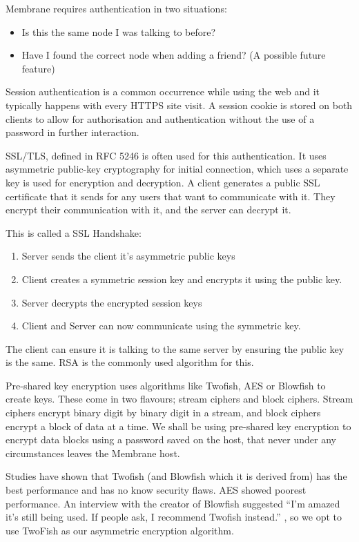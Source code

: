 \documentclass[11pt, a4paper, twocolumn, twoside]{report}
\begin{document}
Membrane requires authentication in two situations:
\begin{itemize}
 \item Is this the same node I was talking to before?
 \item Have I found the correct node when adding a friend? (A possible future feature)
\end{itemize}

Session authentication is a common occurrence while using the web and it typically happens with every HTTPS site visit. A session cookie is stored on both clients to allow for authorisation and authentication without the use of a password in further interaction. \citep{mayo2008security}

SSL/TLS, defined in RFC 5246 \citep{dierks2008transport} is often used for this authentication. It uses asymmetric public-key cryptography for initial connection, which uses a separate key is used for encryption and decryption. A client generates a public SSL certificate that it sends for any users that want to communicate with it. They encrypt their communication with it, and the server can decrypt it.

This is called a SSL Handshake:

\begin{enumerate}
 \item Server sends the client it's asymmetric public keys
 \item Client creates a symmetric session key and encrypts it using the public key.
 \item Server decrypts the encrypted session keys
 \item Client and Server can now communicate using the symmetric key.
\end{enumerate}

The client can ensure it is talking to the same server by ensuring the public key is the same. RSA is the commonly used algorithm for this.

Pre-shared key encryption uses algorithms like Twofish, AES or Blowfish to create keys. These come in two flavours; stream ciphers and block ciphers. Stream ciphers encrypt binary digit by binary digit in a stream, and block ciphers encrypt a block of data at a time. We shall be using pre-shared key encryption to encrypt data blocks using a password saved on the host, that never under any circumstances leaves the Membrane host.

Studies have shown that Twofish (and Blowfish which it is derived from) has the best performance and has no know security flaws. AES showed poorest performance. \citep*{thakur2011aes, rizvi2011performance, mushtaque2014evaluation} An interview with the creator of Blowfish suggested ``I'm amazed it's still being used. If people ask, I recommend Twofish instead.'' \cite{fish2007bruce}, so we opt to use TwoFish as our asymmetric encryption algorithm.
\end{document}
